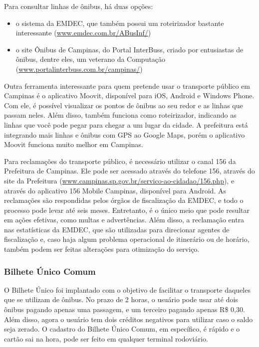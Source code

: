 Para consultar linhas de ônibus, há duas opções:
\begin{itemize}
  \item o sistema da EMDEC, que também possui um roteirizador bastante
interessante (\url{www.emdec.com.br/ABusInf/})
  \item o site Ônibus de Campinas, do Portal InterBuss, criado por entusiastas
de ônibus, dentre eles, um veterano da Computação
(\url{www.portalinterbuss.com.br/campinas/})
\end{itemize}

Outra ferramenta interessante para quem pretende usar o transporte público em
Campinas é o aplicativo Moovit, disponível para iOS, Android e Windows
Phone. Com ele, é possível visualizar os pontos de ônibus ao seu redor e as
linhas que passam neles. Além disso, também funciona como roteirizador,
indicando as linhas que você pode pegar para chegar a um lugar da cidade.
A prefeitura está integrando mais linhas e ônibus com GPS ao Google Maps, porém
o aplicativo Moovit funciona muito melhor em Campinas.

Para reclamações do transporte público, é necessário utilizar o canal 156 da
Prefeitura de Campinas. Ele pode ser acessado através do telefone 156, através
do site da Prefeitura
(\url{www.campinas.sp.gov.br/servico-ao-cidadao/156.php}),
e através do aplicativo 156 Mobile Campinas, disponível para Android. As
reclamações são respondidas pelos órgãos de fiscalização da EMDEC, e todo o
processo pode levar até seis meses. Entretanto, é o único meio que pode
resultar em ações efetivas, como multas e advertências. Além disso, a
reclamação entra nas estatísticas da EMDEC, que são utilizadas para direcionar
agentes de fiscalização e, caso haja algum problema operacional de itinerário
ou de horário, também podem ser feitas alterações para otimização do serviço.

\subsubsection{Bilhete Único Comum}

O Bilhete Único foi implantado com o objetivo de facilitar o transporte
daqueles que se utilizam de ônibus. No prazo de 2 horas, o usuário pode usar
até dois ônibus pagando apenas uma passagem, e um terceiro pagando apenas
R\$ 0,30. Além disso, agora o usuário tem dois créditos negativos para utilizar
caso o saldo seja zerado. O cadastro do Bilhete Único Comum, em específico, é
rápido e o cartão sai na hora, pode ser feito em qualquer terminal rodoviário.

